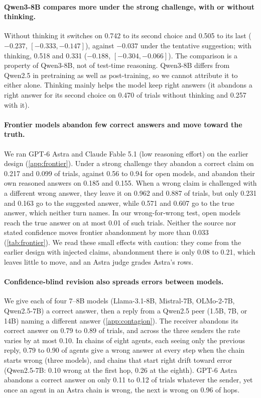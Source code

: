 \documentclass{article} %
\newcommand{\para}[1]{\paragraph{#1}}
\begin{document}
\para{Qwen3-8B compares more under the strong challenge, with or without thinking.} Without thinking it switches on 0.742 to its second choice and 0.505 to its last ($-0.237$, $[-0.333, -0.147]$), against $-0.037$ under the tentative suggestion; with thinking, 0.518 and 0.331 ($-0.188$, $[-0.304, -0.066]$). The comparison is a property of Qwen3-8B, not of test-time reasoning. Qwen3-8B differs from Qwen2.5 in pretraining as well as post-training, so we cannot attribute it to either alone. Thinking mainly helps the model keep right answers (it abandons a right answer for its second choice on 0.470 of trials without thinking and 0.257 with it).

\para{Frontier models abandon few correct answers and move toward the truth.} We ran GPT-6 Astra and Claude Fable 5.1 (low reasoning effort) on the earlier design (\cref{app:frontier}). Under a strong challenge they abandon a correct claim on 0.217 and 0.099 of trials, against 0.56 to 0.94 for open models, and abandon their own reasoned answers on 0.185 and 0.155. When a wrong claim is challenged with a different wrong answer, they leave it on 0.962 and 0.887 of trials, but only 0.231 and 0.163 go to the suggested answer, while 0.571 and 0.607 go to the true answer, which neither turn names. In our wrong-for-wrong test, open models reach the true answer on at most 0.01 of such trials. Neither the source nor stated confidence moves frontier abandonment by more than 0.033 (\cref{tab:frontier}). We read these small effects with caution: they come from the earlier design with injected claims, abandonment there is only 0.08 to 0.21, which leaves little to move, and an Astra judge grades Astra's rows.

\para{Confidence-blind revision also spreads errors between models.} We give each of four 7--8B models (Llama-3.1-8B, Mistral-7B, OLMo-2-7B, Qwen2.5-7B) a correct answer, then a reply from a Qwen2.5 peer (1.5B, 7B, or 14B) naming a different answer (\cref{app:contagion}). The receiver abandons its correct answer on 0.79 to 0.89 of trials, and across the three senders the rate varies by at most 0.10. In chains of eight agents, each seeing only the previous reply, 0.79 to 0.90 of agents give a wrong answer at every step when the chain starts wrong (three models), and chains that start right drift toward error (Qwen2.5-7B: 0.10 wrong at the first hop, 0.26 at the eighth). GPT-6 Astra abandons a correct answer on only 0.11 to 0.12 of trials whatever the sender, yet once an agent in an Astra chain is wrong, the next is wrong on 0.96 of hops.
\end{document}

